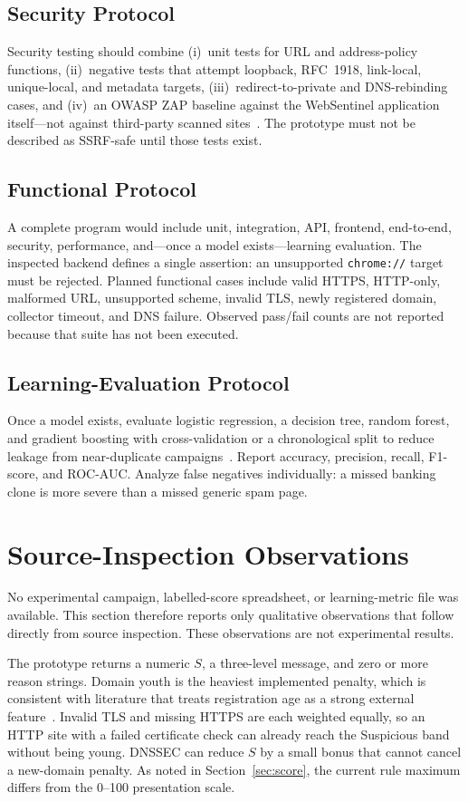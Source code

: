 \documentclass[conference]{IEEEtran}
\begin{document}
\subsection{Security Protocol}
Security testing should combine (i)~unit tests for URL and address-policy functions, (ii)~negative tests that attempt loopback, RFC~1918, link-local, unique-local, and metadata targets, (iii)~redirect-to-private and DNS-rebinding cases, and (iv)~an OWASP ZAP baseline against the WebSentinel application itself---not against third-party scanned sites~\cite{owasp2021top10}. The prototype must not be described as SSRF-safe until those tests exist.

\subsection{Functional Protocol}
A complete program would include unit, integration, API, frontend, end-to-end, security, performance, and---once a model exists---learning evaluation. The inspected backend defines a single assertion: an unsupported \texttt{chrome://} target must be rejected. Planned functional cases include valid HTTPS, HTTP-only, malformed URL, unsupported scheme, invalid TLS, newly registered domain, collector timeout, and DNS failure. Observed pass/fail counts are not reported because that suite has not been executed.

\subsection{Learning-Evaluation Protocol}
Once a model exists, evaluate logistic regression, a decision tree, random forest, and gradient boosting with cross-validation or a chronological split to reduce leakage from near-duplicate campaigns~\cite{xiang2011cantinaplus,hannousse2021benchmark}. Report accuracy, precision, recall, F1-score, and ROC-AUC. Analyze false negatives individually: a missed banking clone is more severe than a missed generic spam page.

\section{Source-Inspection Observations}
\label{sec:results}
No experimental campaign, labelled-score spreadsheet, or learning-metric file was available. This section therefore reports only qualitative observations that follow directly from source inspection. These observations are not experimental results.

The prototype returns a numeric $S$, a three-level message, and zero or more reason strings. Domain youth is the heaviest implemented penalty, which is consistent with literature that treats registration age as a strong external feature~\cite{ma2009beyond,hannousse2021benchmark}. Invalid TLS and missing HTTPS are each weighted equally, so an HTTP site with a failed certificate check can already reach the Suspicious band without being young. DNSSEC can reduce $S$ by a small bonus that cannot cancel a new-domain penalty. As noted in Section~\ref{sec:score}, the current rule maximum differs from the 0--100 presentation scale.
\end{document}
